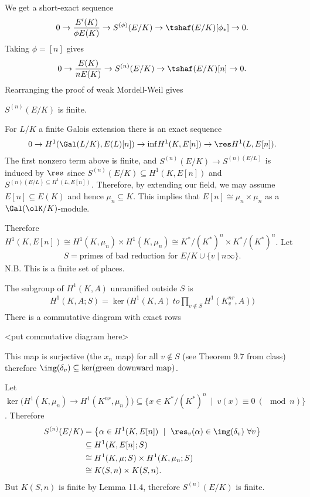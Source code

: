 We get a short-exact sequence
\begin{align*}
	0 \to \frac{E'(K)}{\phi E(K)} \to S^{(\phi)}(E/K) \to \tshaf(E/K)[\phi_*] \to 0.
\end{align*}
Taking $\phi = [n]$ gives
\begin{align*}
	0 \to \frac{E(K)}{nE(K)}\to S^{(n)}(E/K) \to \tshaf(E/K)[n] \to 0.
\end{align*}
Rearranging the proof of weak Mordell-Weil gives
\begin{thm}\label{thm:S-is-finite}
	$S^{(n)}(E/K)$ is finite.
\end{thm}
\begin{prf}
	For $L/K$ a finite Galois extension there is an exact sequence
	\begin{align*}
		0 \to H^1(\Gal(L/K), E(L)[n]) \to{\inf} H^1(K,E[n]) \to{\res} H^1(L,E[n]).
	\end{align*}
	The first nonzero term above is finite, and $S^{(n)}(E/K) \to S^{(n)(E/L)}$ is induced by $\res$ since $S^{(n)}(E/K) \subseteq H^1(K,E[n])$ and $S^{(n)(E/L) \subseteq H^1(L,E[n])}$. Therefore, by extending our field, we may assume $E[n] \subseteq E(K)$ and hence $\mu_n \subseteq K$. This implies that $E[n] \cong \mu_n \times \mu_n$ as a $\Gal(\olK/K)$-module.

	Therefore $H^1(K,E[n]) \cong H^1(K,\mu_n) \times H^1(K,\mu_n)\cong K^*/(K^*)^n \times K^*/(K^*)^n$. Let
	\begin{align*}
		S = \text{primes of bad reduction for $E/K$} \cup \{v \mid n \infty\}.
	\end{align*}
	N.B. This is a finite set of places.
\end{prf}

\begin{defn}\label{defn:unramifiedoutsideS}
	The subgroup of $H^1(K,A)$ unramified outside $S$ is
	\begin{align*}
		H^1(K,A;S) = \ker\big(H^1(K,A)\ to \prod_{v\not\in S} H^1(K_v^{nr},A)\big)
	\end{align*}
	There is a commutative diagram with exact rows 
	\begin{center}
		<put commutative diagram here>
	\end{center}
	This map is surjective (the $x_n$ map) for all $v \not\in S$ (see Theorem 9.7 from class) therefore $\img(\delta_v) \subseteq \ker(\text{green downward map})$.
\end{defn}
\begin{lem}
	Let $\ker\big(H^1(K,\mu_n) \to H^1(K^{nr},\mu_n)\big) \subseteq \{x \in K^*/(K^*)^n ~ \mid ~ v(x) \equiv 0 ~ (\mod n)\}$.
	Therefore
	\begin{align*}
		S^{(n)}(E/K) &= \left\{\alpha \in H^1(K, E[n]) ~\mid ~ \res_v(\alpha) \in \img(\delta_v) ~ \forall v\right\} \\
					 &\subseteq H^1(K,E[n]; S) \\
					 &\cong H^1(K,\mu; S) \times H^1(K,\mu_n ; S) \\
					 &\cong K(S,n)\times K(S,n).
	\end{align*}
	But $K(S,n)$ is finite by Lemma 11.4, therefore $S^{(n)}(E/K)$ is finite.
\end{lem}

